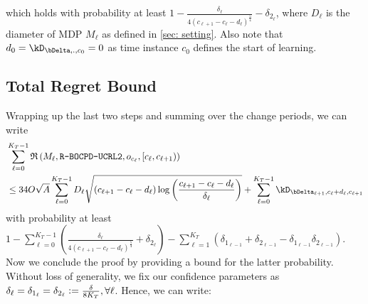 \documentclass{article} %
\newcommand{\dfq}{\vcentcolon=}
\begin{document}
which holds with probability at least $1-\frac{\delta_\ell}{4\left(c_{\ell+1}- c_{\ell}-d_{\ell}\right)^\frac{5}{4}} -\delta_{2_\ell}$, where $D_\ell$ is the diameter of MDP $M_\ell$ as defined in \ref{sec: setting}. Also note that $d_0 = \kD_{\bDelta,.,c_0} = 0$ as time instance $c_0$ defines the start of learning. 




\subsection{Total Regret Bound}
Wrapping up the last two steps and summing over the change periods, we can write 
\begin{align}
& \sum\limits_{\ell=0}^{K_T-1} \mathfrak{R} \left(M_\ell, \texttt{R-BOCPD-UCRL2}, o_{c_\ell}, \left[c_\ell, c_{\ell+1}\right) \right) \nonumber \\ 
& \leq 34 O \sqrt{A} \sum\limits_{\ell=0}^{K_T-1} D_\ell \sqrt{\left(c_{\ell+1}-c_{\ell}-d_{\ell} \right) \log\left(\frac{c_{\ell+1}-c_{\ell}-d_{\ell}}{\delta_\ell} \right)} + \sum\limits_{\ell=0}^{K_T-1} \kD_{\bDelta_{\ell+1},c_{\ell}+d_{\ell},c_{\ell+1}}
\end{align}
with probability at least $1-\sum\limits_{\ell=0}^{K_T-1} \left(\frac{\delta_\ell}{4\left(c_{\ell+1}- c_{\ell}-d_{\ell}\right)^\frac{5}{4}} + \delta_{2_\ell}\right) - \sum\limits_{\ell=1}^{K_T} \left( \delta_{1_{\ell-1}} +  \delta_{2_{\ell-1}} -  \delta_{1_{\ell-1}}\delta_{2_{\ell-1}}\right)$. Now we conclude the proof by providing a bound for the latter probability. Without loss of generality, we fix our confidence parameters as $\delta_\ell = \delta_{1_\ell} = \delta_{2_\ell} \dfq \frac{\delta}{8 K_T}, \forall \ell$. Hence, we can write:
\end{document}
